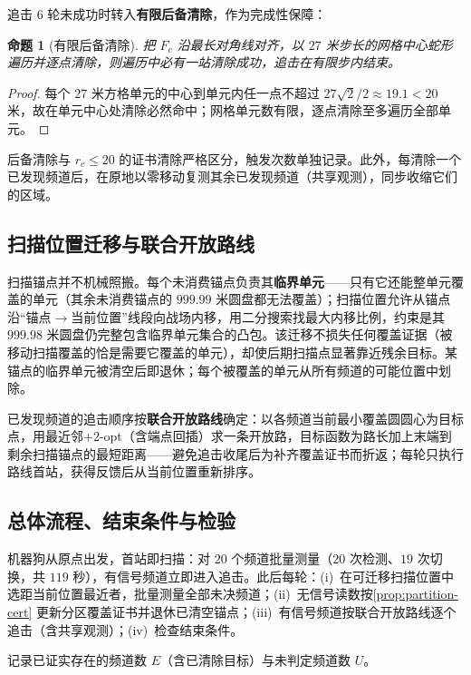 \documentclass[withoutpreface]{cumcmthesis}
\newtheorem{proposition}{命题}
\begin{document}
追击 $6$ 轮未成功时转入\textbf{有限后备清除}，作为完成性保障：

\begin{proposition}[有限后备清除]\label{prop:fallback-clear}
把 $F_c$ 沿最长对角线对齐，以 $27$ 米步长的网格中心蛇形遍历并逐点清除，则遍历中必有一站清除成功，追击在有限步内结束。
\end{proposition}
\begin{proof}
每个 $27$ 米方格单元的中心到单元内任一点不超过 $27\sqrt2/2\approx19.1<20$ 米，故在单元中心处清除必然命中；网格单元数有限，逐点清除至多遍历全部单元。
\end{proof}

后备清除与 $r_c\le20$ 的证书清除严格区分，触发次数单独记录。此外，每清除一个已发现频道后，在原地以零移动复测其余已发现频道（共享观测），同步收缩它们的区域。

\subsection{扫描位置迁移与联合开放路线}

扫描锚点并不机械照搬。每个未消费锚点负责其\textbf{临界单元}——只有它还能整单元覆盖的单元（其余未消费锚点的 $999.99$ 米圆盘都无法覆盖）；扫描位置允许从锚点沿“锚点$\to$当前位置”线段向战场内移，用二分搜索找最大内移比例，约束是其 $999.98$ 米圆盘仍完整包含临界单元集合的凸包。该迁移不损失任何覆盖证据（被移动扫描覆盖的恰是需要它覆盖的单元），却使后期扫描点显著靠近残余目标。某锚点的临界单元被清空后即退休；每个被覆盖的单元从所有频道的可能位置中划除。

已发现频道的追击顺序按\textbf{联合开放路线}确定：以各频道当前最小覆盖圆圆心为目标点，用最近邻$+$2-opt（含端点回插）求一条开放路，目标函数为路长加上末端到剩余扫描锚点的最短距离——避免追击收尾后为补齐覆盖证书而折返；每轮只执行路线首站，获得反馈后从当前位置重新排序。

\subsection{总体流程、结束条件与检验}

机器狗从原点出发，首站即扫描：对 $20$ 个频道批量测量（$20$ 次检测、$19$ 次切换，共 $119$ 秒），有信号频道立即进入追击。此后每轮：(i)~在可迁移扫描位置中选距当前位置最近者，批量测量全部未决频道；(ii)~无信号读数按\cref{prop:partition-cert} 更新分区覆盖证书并退休已清空锚点；(iii)~有信号频道按联合开放路线逐个追击（含共享观测）；(iv)~检查结束条件。

记录已证实存在的频道数 $E$（含已清除目标）与未判定频道数 $U$。
\end{document}
